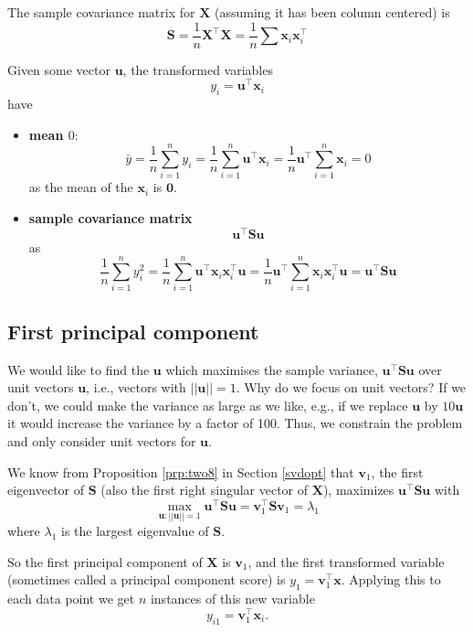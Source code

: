 \documentclass[
]{book}
\theoremstyle{definition}
\theoremstyle{definition}
\theoremstyle{definition}
\theoremstyle{definition}
\theoremstyle{remark}
\begin{document}
The sample covariance matrix for \(\mathbf X\) (assuming it has been column centered) is
\[\mathbf S= \frac{1}{n}\mathbf X^\top \mathbf X= \frac{1}{n}\sum \mathbf x_i\mathbf x_i^\top\]

Given some vector \(\mathbf u\), the transformed variables
\[y_i = \mathbf u^\top \mathbf x_i\]
have

\begin{itemize}
\item
  \textbf{mean \(0\)}:
  \[\bar{y}= \frac{1}{n}\sum_{i=1}^n y_i = \frac{1}{n}\sum_{i=1}^n \mathbf u^\top \mathbf x_i =\frac{1}{n} \mathbf u^\top \sum_{i=1}^n  \mathbf x_i = 0\]
  as the mean of the \(\mathbf x_i\) is \({\boldsymbol 0}\).
\item
  \textbf{sample covariance matrix} \[\mathbf u^\top \mathbf S\mathbf u\]
  as
  \[\frac{1}{n} \sum_{i=1}^n y_i^2 = \frac{1}{n} \sum_{i=1}^n \mathbf u^\top \mathbf x_i \mathbf x_i^\top\mathbf u= \frac{1}{n}\mathbf u^\top \sum_{i=1}^n  \mathbf x_i \mathbf x_i^\top \mathbf u= \mathbf u^\top \mathbf S\mathbf u
  \]
\end{itemize}

\hypertarget{first-principal-component}{%
\subsection{First principal component}\label{first-principal-component}}

We would like to find the \(\mathbf u\) which maximises the sample variance, \(\mathbf u^\top \mathbf S\mathbf u\) over unit vectors \(\mathbf u\), i.e., vectors with \(||\mathbf u||=1\). Why do we focus on unit vectors? If we don't, we could make the variance as large as we like, e.g., if we replace \(\mathbf u\) by \(10\mathbf u\) it would increase the variance by a factor of 100. Thus, we constrain the problem and only consider unit vectors for \(\mathbf u\).

We know from Proposition \ref{prp:two8} in Section \ref{svdopt} that \(\mathbf v_1\), the first eigenvector of \(\mathbf S\) (also the first right singular vector of \(\mathbf X\)), maximizes \(\mathbf u^\top \mathbf S\mathbf u\) with
\[  \max_{\mathbf u: ||\mathbf u||=1} \mathbf u^\top \mathbf S\mathbf u= \mathbf v_1^\top \mathbf S\mathbf v_1 =\lambda_1\]
where \(\lambda_1\) is the largest eigenvalue of \(\mathbf S\).

So the first principal component of \(\mathbf X\) is \(\mathbf v_1\), and the first transformed variable (sometimes called a principal component score) is \(y_1 = \mathbf v_1 ^\top \mathbf x\).
Applying this to each data point we get \(n\) instances of this new variable
\[y_{i1} = \mathbf v_1 ^\top \mathbf x_i.\]
\end{document}
